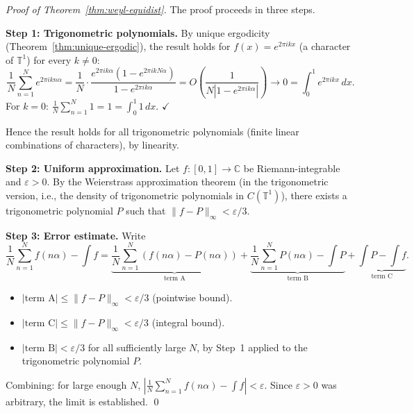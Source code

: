 \begin{proof}[Proof of Theorem~\ref{thm:weyl-equidist}]
The proof proceeds in three steps.

\medskip\noindent\textbf{Step 1: Trigonometric polynomials.}
By unique ergodicity (Theorem~\ref{thm:unique-ergodic}), the result holds for
$f(x) = e^{2\pi ikx}$ (a character of $\mathbb{T}^1$) for every $k \ne 0$:
\begin{equation}\label{eq:weyl-characters}
  \frac{1}{N}\sum_{n=1}^{N} e^{2\pi ikn\alpha}
  = \frac{1}{N} \cdot \frac{e^{2\pi ik\alpha}(1 - e^{2\pi ikN\alpha})}{1 - e^{2\pi ik\alpha}}
  = O\!\left(\frac{1}{N|1 - e^{2\pi ik\alpha}|}\right) \to 0 = \int_0^1 e^{2\pi ikx}\, dx.
\end{equation}
For $k = 0$: $\frac{1}{N}\sum_{n=1}^N 1 = 1 = \int_0^1 1\, dx$. $\checkmark$

Hence the result holds for all trigonometric polynomials (finite linear combinations
of characters), by linearity.

\medskip\noindent\textbf{Step 2: Uniform approximation.}
Let $f: [0,1] \to \mathbb{C}$ be Riemann-integrable and $\varepsilon > 0$.
By the Weierstrass approximation theorem (in the trigonometric version, i.e., the
density of trigonometric polynomials in $C(\mathbb{T}^1)$), there exists a
trigonometric polynomial $P$ such that $\|f - P\|_\infty < \varepsilon/3$.

\medskip\noindent\textbf{Step 3: Error estimate.}
Write
\begin{equation}
  \frac{1}{N}\sum_{n=1}^N f(n\alpha) - \int f
  = \underbrace{\frac{1}{N}\sum_{n=1}^N (f(n\alpha) - P(n\alpha))}_{\text{term A}}
  + \underbrace{\frac{1}{N}\sum_{n=1}^N P(n\alpha) - \int P}_{\text{term B}}
  + \underbrace{\int P - \int f}_{\text{term C}}.
\end{equation}
\begin{itemize}
\item $|\text{term A}| \le \|f - P\|_\infty < \varepsilon/3$ (pointwise bound).
\item $|\text{term C}| \le \|f - P\|_\infty < \varepsilon/3$ (integral bound).
\item $|\text{term B}| < \varepsilon/3$ for all sufficiently large $N$, by Step~1
  applied to the trigonometric polynomial $P$.
\end{itemize}
Combining: for large enough $N$, $\left|\frac{1}{N}\sum_{n=1}^N f(n\alpha) - \int f\right| < \varepsilon$.
Since $\varepsilon > 0$ was arbitrary, the limit is established.
\qed
\end{proof}

